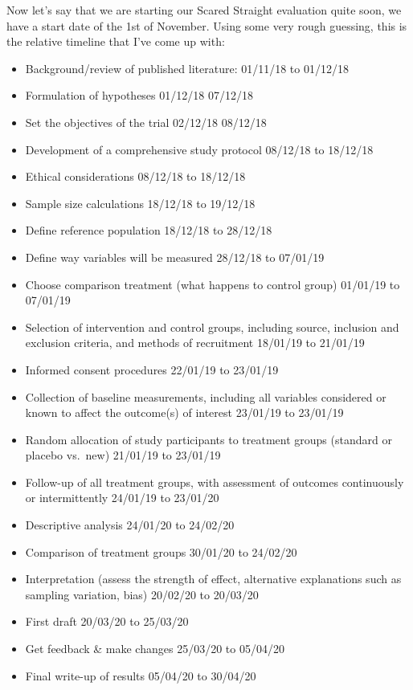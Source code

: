 \documentclass[]{book}
\providecommand{\tightlist}{%
  \setlength{\itemsep}{0pt}\setlength{\parskip}{0pt}}
\theoremstyle{definition}
\theoremstyle{definition}
\theoremstyle{definition}
\theoremstyle{remark}
\begin{document}
Now let's say that we are starting our Scared Straight evaluation quite
soon, we have a start date of the 1st of November. Using some very rough
guessing, this is the relative timeline that I've come up with:

\begin{itemize}
\tightlist
\item
  Background/review of published literature: 01/11/18 to 01/12/18
\item
  Formulation of hypotheses 01/12/18 07/12/18
\item
  Set the objectives of the trial 02/12/18 08/12/18
\item
  Development of a comprehensive study protocol 08/12/18 to 18/12/18
\item
  Ethical considerations 08/12/18 to 18/12/18
\item
  Sample size calculations 18/12/18 to 19/12/18
\item
  Define reference population 18/12/18 to 28/12/18
\item
  Define way variables will be measured 28/12/18 to 07/01/19
\item
  Choose comparison treatment (what happens to control group) 01/01/19
  to 07/01/19
\item
  Selection of intervention and control groups, including source,
  inclusion and exclusion criteria, and methods of recruitment 18/01/19
  to 21/01/19
\item
  Informed consent procedures 22/01/19 to 23/01/19
\item
  Collection of baseline measurements, including all variables
  considered or known to affect the outcome(s) of interest 23/01/19 to
  23/01/19
\item
  Random allocation of study participants to treatment groups (standard
  or placebo vs.~new) 21/01/19 to 23/01/19
\item
  Follow-up of all treatment groups, with assessment of outcomes
  continuously or intermittently 24/01/19 to 23/01/20
\item
  Descriptive analysis 24/01/20 to 24/02/20
\item
  Comparison of treatment groups 30/01/20 to 24/02/20
\item
  Interpretation (assess the strength of effect, alternative
  explanations such as sampling variation, bias) 20/02/20 to 20/03/20
\item
  First draft 20/03/20 to 25/03/20
\item
  Get feedback \& make changes 25/03/20 to 05/04/20
\item
  Final write-up of results 05/04/20 to 30/04/20
\end{itemize}
\end{document}
